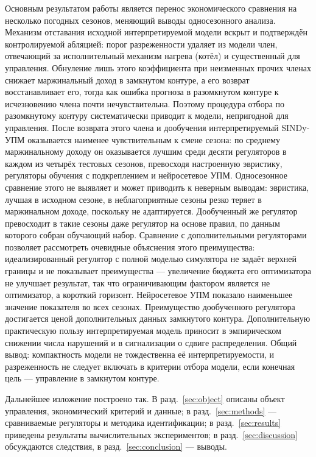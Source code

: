 \documentclass[12pt,a4paper,leqno]{article}
\begin{document}
Основным результатом работы является перенос экономического сравнения на несколько
погодных сезонов, меняющий выводы односезонного анализа. Механизм отставания исходной
интерпретируемой модели вскрыт и подтверждён контролируемой абляцией: порог разреженности
удаляет из модели член, отвечающий за исполнительный механизм нагрева (котёл) и
существенный для управления. Обнуление лишь этого коэффициента при неизменных прочих
членах снижает маржинальный доход в замкнутом контуре, а его возврат восстанавливает его, тогда как
ошибка прогноза в разомкнутом контуре к исчезновению члена почти нечувствительна.
Поэтому процедура отбора по разомкнутому контуру систематически приводит к модели,
непригодной для управления. После возврата этого члена и дообучения интерпретируемый
SINDy-УПМ оказывается наименее чувствительным к смене сезона: по среднему маржинальному доходу он
оказывается лучшим среди десяти регуляторов в каждом из четырёх тестовых сезонов,
превосходя настроенную эвристику, регуляторы обучения с подкреплением и нейросетевое
УПМ. Односезонное сравнение этого не выявляет и может приводить к неверным выводам:
эвристика, лучшая в исходном сезоне, в неблагоприятные сезоны резко теряет в маржинальном доходе,
поскольку не адаптируется. Дообученный же регулятор превосходит в такие сезоны даже
регулятор на основе правил, по данным которого собран обучающий набор. Сравнение с
дополнительными регуляторами позволяет рассмотреть очевидные объяснения этого преимущества:
идеализированный регулятор с полной моделью симулятора не задаёт верхней границы и не
показывает преимущества — увеличение бюджета его оптимизатора не улучшает результат, так
что ограничивающим фактором является не оптимизатор, а короткий горизонт. Нейросетевое
УПМ показало наименьшее значение показателя во всех сезонах. Преимущество дообученного регулятора достигается
ценой дополнительных данных замкнутого контура. Дополнительную практическую пользу
интерпретируемая модель приносит в эмпирическом снижении числа нарушений и в сигнализации о
сдвиге распределения. Общий вывод: компактность модели
не тождественна её интерпретируемости, и разреженность не следует включать в
критерии отбора модели, если конечная цель — управление в замкнутом контуре.

Дальнейшее изложение построено так. В разд.~\ref{sec:object} описаны объект
управления, экономический критерий и данные; в разд.~\ref{sec:methods} —
сравниваемые регуляторы и методика идентификации; в разд.~\ref{sec:results}
приведены результаты вычислительных экспериментов; в разд.~\ref{sec:discussion}
обсуждаются следствия, в разд.~\ref{sec:conclusion} — выводы.
\end{document}
